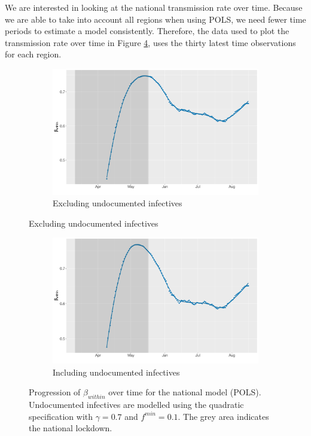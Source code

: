 \documentclass[12pt]{article}
\begin{document}
	We are interested in looking at the national transmission rate over time. Because we are able to take into account all regions when using POLS, we need fewer time periods to estimate a model consistently. Therefore, the data used to plot the transmission rate over time in Figure \ref{fig:beta_within_over_time_national}, uses the thirty latest time observations for each region.
	
	\begin{figure}[H]
	    \centering
	    \begin{subfigure}{\textwidth}
	      \centering
	      \includegraphics[width=0.94\linewidth]{output/model_within_lag14_betawithin_National_rolling.pdf}
	      \caption{Excluding undocumented infectives}
	      \label{fig:beta_within_over_time_national_regular}
	    \end{subfigure}\newline
    \end{figure}
    \begin{figure}[H]\ContinuedFloat
	    \begin{subfigure}{\textwidth}
	      \centering
	      \includegraphics[width=0.94\linewidth]{output/model_within_lag14_betawithin_National_UndocQuadratic_rolling.pdf}
	      \caption{Including undocumented infectives}
	      \label{fig:beta_within_over_time_national_regular_undoc}
	    \end{subfigure}
	    \caption{Progression of $\beta_{within}$ over time for the national model (POLS). Undocumented infectives are modelled using the quadratic specification with $\gamma = 0.7$ and $f^{min}=0.1$. The grey area indicates the national lockdown.}
	    \label{fig:beta_within_over_time_national}
    \end{figure}
	
\end{document}
